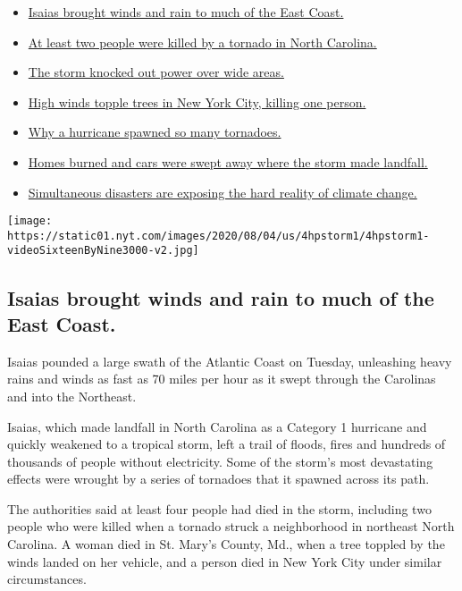 \begin{itemize}
\tightlist
\item
  \protect\hyperlink{link-38d68049}{Isaias brought winds and rain to
  much of the East Coast.}
\item
  \protect\hyperlink{link-7961bdbc}{At least two people were killed by a
  tornado in North Carolina.}
\item
  \protect\hyperlink{link-3480f4a1}{The storm knocked out power over
  wide areas.}
\item
  \protect\hyperlink{link-2673c54}{High winds topple trees in New York
  City, killing one person.}
\item
  \protect\hyperlink{link-5275f1d1}{Why a hurricane spawned so many
  tornadoes.}
\item
  \protect\hyperlink{link-5066ef1c}{Homes burned and cars were swept
  away where the storm made landfall.}
\item
  \protect\hyperlink{link-665175e7}{Simultaneous disasters are exposing
  the hard reality of climate change.}
\end{itemize}

\texttt{[image: https://static01.nyt.com/images/2020/08/04/us/4hpstorm1/4hpstorm1-videoSixteenByNine3000-v2.jpg]}

\hypertarget{isaias-brought-winds-and-rain-to-much-of-the-east-coast}{%
\subsection{Isaias brought winds and rain to much of the East
Coast.}\label{isaias-brought-winds-and-rain-to-much-of-the-east-coast}}

Isaias pounded a large swath of the Atlantic Coast on Tuesday,
unleashing heavy rains and winds as fast as 70 miles per hour as it
swept through the Carolinas and into the Northeast.

Isaias, which made landfall in North Carolina as a Category 1 hurricane
and quickly weakened to a tropical storm, left a trail of floods, fires
and hundreds of thousands of people without electricity. Some of the
storm's most devastating effects were wrought by a series of tornadoes
that it spawned across its path.

The authorities said at least four people had died in the storm,
including two people who were killed when a tornado struck a
neighborhood in northeast North Carolina. A woman died in St. Mary's
County, Md., when a tree toppled by the winds landed on her vehicle, and
a person died in New York City under similar circumstances.

